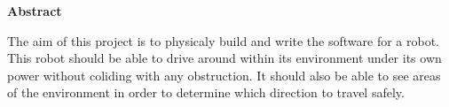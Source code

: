 \thispagestyle{empty}

\begin{center}
    {\LARGE\bf Abstract}
\end{center}
The aim of this project is to physicaly build and write the software for a robot.  This robot should be able to drive around within its environment under its own power without coliding with any obstruction.  It should also be able to see areas of the environment in order to determine which direction to travel safely.
